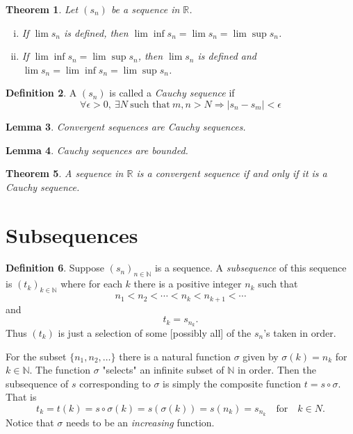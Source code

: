 \documentclass[12pt, lettersize]{book}
\theoremstyle{plain}
\newtheorem{thm}{Theorem}[section]
\newtheorem{lem}[thm]{Lemma}
\theoremstyle{definition}
\newtheorem{dfn}[thm]{Definition}
\theoremstyle{remark}
\newcommand{\R}{\mathbb{R}}
\begin{document}
	\begin{thm}\label{def:condition for limit}
		Let $(s_n)$ be a sequence in $\mathbb{R}$.
		\begin{enumerate}[(i)]
			\item If $\lim s_n$ is defined, then $\lim\inf s_n=\lim s_n=\lim\sup s_n$.
			\item If $\lim\inf s_n=\lim\sup s_n$, then $\lim s_n$ is defined and $\lim s_n=\lim\inf s_n=\lim\sup s_n$.
		\end{enumerate}
	\end{thm}
	
	\begin{dfn}\label{def:cauchy-seq}
		A $(s_n)$ is called a \emph{Cauchy sequence} if 
		\begin{displaymath}
			\forall\epsilon>0,\ \exists N\ \text{such that}\ m,n>N\Rightarrow|s_n-s_m|<\epsilon
		\end{displaymath}
	\end{dfn}
	\begin{lem}
		Convergent sequences are Cauchy sequences.
	\end{lem}
	
	\begin{lem}
		Cauchy sequences are bounded.
	\end{lem}
	
	\begin{thm}\label{def:cauchy iff convergent}
		A sequence in $\R$ is a convergent sequence if and only if it is a Cauchy sequence.
	\end{thm}
	\newpage
	
	\section{Subsequences}
		\begin{dfn}
			Suppose $(s_n)_{n\in\mathbb{N}}$ is a sequence. A \emph{subsequence} of this sequence is $(t_k)_{k\in\mathbb{N}}$ where for each $k$ there is a positive integer $n_k$ such that
			\begin{equation*}
				n_1<n_2<\cdots<n_k<n_{k+1}<\cdots
			\end{equation*}
			and
			\begin{equation*}
				t_k=s_{n_k}.
			\end{equation*}
			Thus $(t_k)$ is just a selection of some [possibly all] of the $s_n$'s taken in order.
		\end{dfn}
		For the subset $\{n_1,n_2,\dots\}$ there is a natural function $\sigma$ given by $\sigma(k)=n_k$ for $k\in\mathbb{N}$. The function $\sigma$ "selects" an infinite subset of $\mathbb{N}$ in order. Then
		the subsequence of $s$ corresponding to $\sigma$ is simply the composite function $t=s\circ\sigma$. That is
		\begin{displaymath}
			t_k=t(k)=s\circ\sigma(k)=s(\sigma(k))=s(n_k)=s_{n_k}\quad\text{for}\quad k\in N.
		\end{displaymath}
		Notice that $\sigma$ needs to be an \emph{increasing} function.
		 
\end{document}
